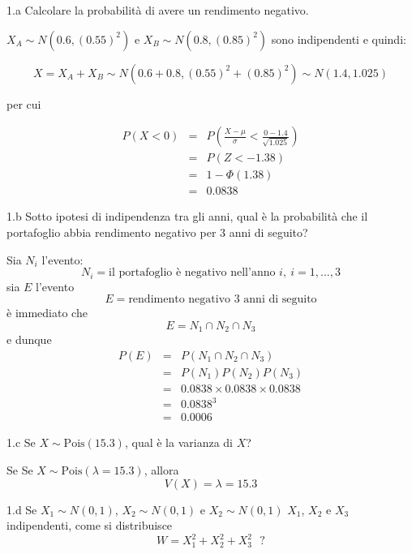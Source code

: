 \documentclass[
  11pt,
]{book}
\theoremstyle{mytheoremstyle}
\theoremstyle{mydefstyle}
\newenvironment{sol}
  {
  \begin{tcolorbox}[enhanced,breakable,arc=0.1mm,boxrule=1pt,colback=white,colframe=iblue,
  title=\bf \fontfamily{lmss}\selectfont \hspace{.5 cm} Soluzione,drop fuzzy shadow]

}{
\end{tcolorbox}
  }
\begin{document}
1.a Calcolare la probabilità di avere un rendimento negativo.

\begin{sol}
\(X_A\sim N(0.6,(0.55)^2)\) e \(X_B\sim N(0.8,(0.85)^2)\) sono indipendenti e quindi:

\[
X=X_A+X_B\sim N(0.6+0.8,(0.55)^2+(0.85)^2)\sim N(1.4,1.025)
\]

per cui

\begin{eqnarray*}
      P( X   <   0 ) 
        &=& P\left(  \frac { X  -  \mu }{ \sigma }  <  \frac { 0  -  1.4 }{\sqrt{ 1.025 }} \right)  \\
                 &=& P\left(  Z   <   -1.38 \right) \\    
                 &=&  1-\Phi( 1.38 ) \\ &=&  0.0838 
      \end{eqnarray*}

\end{sol}

1.b Sotto ipotesi di indipendenza tra gli anni, qual è la probabilità che il portafoglio abbia rendimento negativo per 3 anni di seguito?

\begin{sol}
Sia \(N_i\) l'evento:
\[
N_i = \text{il portafoglio è negativo nell'anno $i$}, \ i=1,...,3
\]
sia \(E\) l'evento
\[
E=\text{rendimento negativo 3 anni di seguito}
\]
è immediato che
\[
E=N_1\cap N_2\cap N_3 
\]
e dunque
\begin{eqnarray*}
P(E)&=&P(N_1\cap N_2\cap N_3 )\\
    &=&P(N_1)P(N_2)P(N_3)\\
    &=& 0.0838\times 0.0838\times 0.0838\\
    &=& 0.0838^3\\
    &=& 0.0006
\end{eqnarray*}

\end{sol}

1.c Se \(X\sim\text{Pois}(15.3)\), qual è la varianza di \(X\)?

\begin{sol}
Se Se \(X\sim\text{Pois}(\lambda=15.3)\), allora
\[V(X)=\lambda=15.3\]

\end{sol}

1.d Se \(X_1\sim N(0,1)\), \(X_2\sim N(0,1)\) e \(X_2\sim N(0,1)\)
\(X_1\), \(X_2\) e \(X_3\) indipendenti, come si distribuisce
\[W=X_1^2+X_2^2+X_3^2 ~~~?\]
\end{document}
